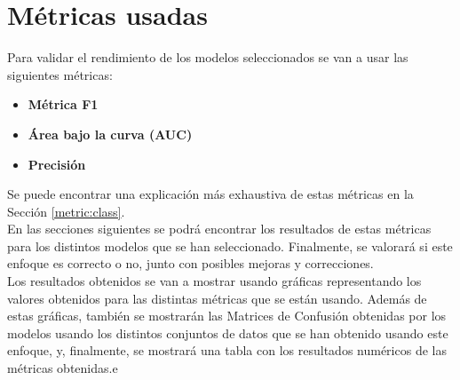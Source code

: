 \section{Métricas usadas}
Para validar el rendimiento de los modelos seleccionados se van a usar las siguientes métricas:
\begin{itemize}
	 \item \textbf{Métrica F1}
	 \item \textbf{Área bajo la curva (AUC)}
	 \item \textbf{Precisión}
\end{itemize}
Se puede encontrar una explicación más exhaustiva de estas métricas en la Sección \ref{metric:class}.\\
\linebreak
En las secciones siguientes se podrá encontrar los resultados de estas métricas para los distintos modelos que se han seleccionado. Finalmente, se valorará si este enfoque es correcto o no, junto con posibles mejoras y correcciones.\\
\linebreak
Los resultados obtenidos se van a mostrar usando gráficas representando los valores obtenidos para las distintas métricas que se están usando. Además de estas gráficas, también se mostrarán las Matrices de Confusión obtenidas por los modelos usando los distintos conjuntos de datos que se han obtenido usando este enfoque, y, finalmente, se mostrará una tabla con los resultados numéricos de las métricas obtenidas.e
\clearpage
